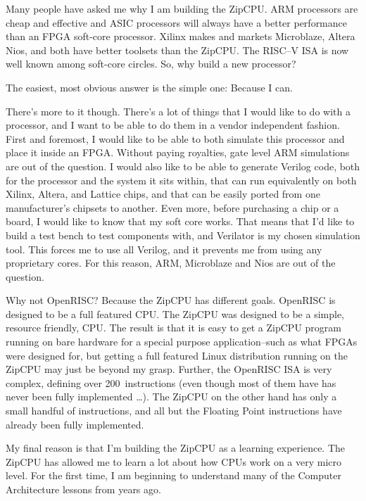 \documentclass{gqtekspec}
\begin{document}
\tableofcontents
\listoffigures
\listoftables
\begin{preface}
Many people have asked me why I am building the ZipCPU. ARM processors are
cheap and effective and ASIC processors will always have a better performance
than an FPGA soft-core processor.  Xilinx makes and markets Microblaze, Altera
Nios, and both have better toolsets than the ZipCPU.  The RISC--V ISA is
now well known among soft-core circles.  So, why build a new processor?

The easiest, most obvious answer is the simple one: Because I can.

There's more to it though. There's a lot of things that I would like to do with
a processor, and I want to be able to do them in a vendor independent fashion.
First and foremost, I would like to be able to both simulate this processor
and place it inside an FPGA.  Without paying royalties, gate level ARM
simulations are out of the question.
I would also like to be able to
generate Verilog code, both for the processor and the system it sits within,
that can run equivalently on both Xilinx, Altera, and Lattice chips, and that
can be easily ported from one manufacturer's chipsets to another.
Even more, before purchasing a chip or a board, I would like to know that my
soft core works.  That means that I'd like to build a test bench to test
components with, and Verilator is my chosen simulation tool. This forces me to
use all Verilog, and it prevents me from using any proprietary cores. For this
reason, ARM, Microblaze and Nios are out of the question.

Why not OpenRISC? Because the ZipCPU has different goals.  OpenRISC is designed
to be a full featured CPU.  The ZipCPU was designed to be a simple, resource
friendly, CPU.  The result is that it is easy to get a ZipCPU program running
on bare hardware for a special purpose application--such as what FPGAs were
designed for, but getting a full featured
Linux distribution running on the ZipCPU may just be beyond my grasp.  Further,
the OpenRISC ISA is very complex, defining over 200~instructions (even though
most of them have has never been fully implemented \ldots).  The ZipCPU on the
other hand has only a small handful of instructions, and all but the Floating
Point instructions have already been fully implemented.

My final reason is that I'm building the ZipCPU as a learning experience. The
ZipCPU has allowed me to learn a lot about how CPUs work on a very micro
level. For the first time, I am beginning to understand many of the Computer
Architecture lessons from years ago.


\end{preface}
\end{document}
